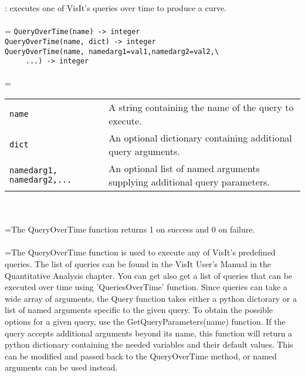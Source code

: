 \documentclass[10pt,a4paper]{report}
\begin{document}
{}
: executes one of VisIt's queries over time to produce a curve.\\[-3mm]

 \\ 
\hangindent=\parindent 
\verb!QueryOverTime(name) -> integer!\\ 
\verb!QueryOverTime(name, dict) -> integer!\\
\verb!QueryOverTime(name, namedarg1=val1,namedarg2=val2,\ ! \\ 
\verb!     ...) -> integer!\\ [-3mm]

 \\ 
\hangindent=\parindent 
\begin{tabular}{lp{9cm}}
\verb!name! & A string containing the name of the query to execute. \\
\verb!dict! & An optional dictionary containing additional query arguments. \\
\verb!namedarg1, namedarg2,...! & An optional list of named arguments supplying additional query parameters. \\
\end{tabular} \\[-2mm]


 \\ 
\hangindent=\parindent The QueryOverTime function returns 1 on success and 0 on failure. \\[-3mm] 

 \\ 
\hangindent=\parindent The QueryOverTime function is used to execute any of VisIt's predefined queries. The list of queries can be found in the VisIt User's Manual in the Quantitative Analysis chapter. You can get also get a list of queries that can be executed over time using 'QueriesOverTime' function. Since queries can take a wide array of arguments, the Query function takes  either a python dictorary or a list of named arguments specific to the  given query.  To obtain the possible options for a given query, use the  GetQueryParameters(name) function.  If the query accepts additional  arguments beyond its name, this function will return a python dictionary containing the needed variables and their default values.  This can be modified and passed back to the QueryOverTime method, or named arguments  can be used instead. \\[-3mm] 
\end{document}

